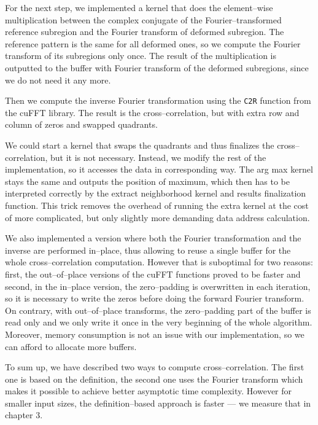 For the next step, we implemented a kernel that does the element--wise multiplication between the complex conjugate of the Fourier--transformed reference subregion and the Fourier transform of deformed subregion. The reference pattern is the same for all deformed ones, so we compute the Fourier transform of its subregions only once. The result of the multiplication is outputted to the buffer with Fourier transform of the deformed subregions, since we do not need it any more.

Then we compute the inverse Fourier transformation using the \texttt{C2R} function from the cuFFT library. The result is the cross--correlation, but with extra row and column of zeros and swapped quadrants.

We could start a kernel that swaps the quadrants and thus finalizes the cross--correlation, but it is not necessary. Instead, we modify the rest of the implementation, so it accesses the data in corresponding way. The arg max kernel stays the same and outputs the position of maximum, which then has to be interpreted correctly by the extract neighborhood kernel and results finalization function. This trick removes the overhead of running the extra kernel at the cost of more complicated, but only slightly more demanding data address calculation.

We also implemented a version where both the Fourier transformation and the inverse are performed in--place, thus allowing to reuse a single buffer for the whole cross--correlation computation. However that is suboptimal for two reasons: first, the out--of--place versions of the cuFFT functions proved to be faster and second, in the in--place version, the zero--padding is overwritten in each iteration, so it is necessary to write the zeros before doing the forward Fourier transform. On contrary, with out--of--place transforms, the zero--padding part of the buffer is read only and we only write it once in the very beginning of the whole algorithm. Moreover, memory consumption is not an issue with our implementation, so we can afford to allocate more buffers.

\vspace{5px}

To sum up, we have described two ways to compute cross--correlation. The first one is based on the definition, the second one uses the Fourier transform which makes it possible to achieve better asymptotic time complexity. However for smaller input sizes, the definition--based approach is faster --- we measure that in chapter 3.

